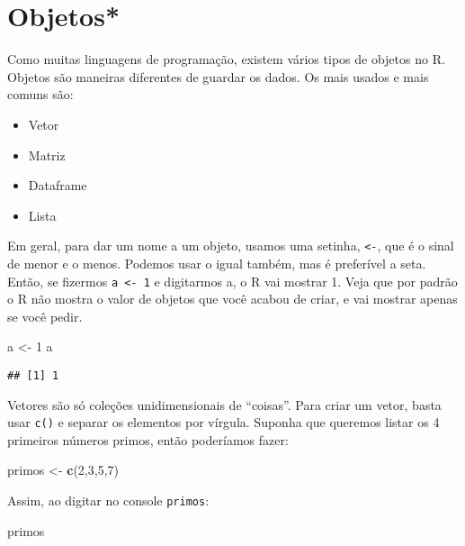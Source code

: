 \documentclass[
]{book}
\newenvironment{Shaded}{\begin{snugshade}}{\end{snugshade}}
\newcommand{\DecValTok}[1]{\textcolor[rgb]{0.00,0.00,0.81}{#1}}
\newcommand{\KeywordTok}[1]{\textcolor[rgb]{0.13,0.29,0.53}{\textbf{#1}}}
\newcommand{\NormalTok}[1]{#1}
\newcommand{\StringTok}[1]{\textcolor[rgb]{0.31,0.60,0.02}{#1}}
\providecommand{\tightlist}{%
  \setlength{\itemsep}{0pt}\setlength{\parskip}{0pt}}
\begin{document}
\hypertarget{objetos}{%
\section{Objetos*}\label{objetos}}

Como muitas linguagens de programação, existem vários tipos de objetos no R. Objetos são maneiras diferentes de guardar os dados. Os mais usados e mais comuns são:

\begin{itemize}
\tightlist
\item
  Vetor
\item
  Matriz
\item
  Dataframe
\item
  Lista
\end{itemize}

Em geral, para dar um nome a um objeto, usamos uma setinha, \texttt{\textless{}-}, que é o sinal de menor e o menos. Podemos usar o igual também, mas é preferível a seta. Então, se fizermos \texttt{a\ \textless{}-\ 1} e digitarmos a, o R vai mostrar 1. Veja que por padrão o R não mostra o valor de objetos que você acabou de criar, e vai mostrar apenas se você pedir.

\begin{Shaded}
\begin{Highlighting}[]
\NormalTok{a \textless{}{-}}\StringTok{ }\DecValTok{1}
\NormalTok{a}
\end{Highlighting}
\end{Shaded}

\begin{verbatim}
## [1] 1
\end{verbatim}

Vetores são só coleções unidimensionais de ``coisas''. Para criar um vetor, basta usar \texttt{c()} e separar os elementos por vírgula. Suponha que queremos listar os 4 primeiros números primos, então poderíamos fazer:

\begin{Shaded}
\begin{Highlighting}[]
\NormalTok{primos \textless{}{-}}\StringTok{ }\KeywordTok{c}\NormalTok{(}\DecValTok{2}\NormalTok{,}\DecValTok{3}\NormalTok{,}\DecValTok{5}\NormalTok{,}\DecValTok{7}\NormalTok{)}
\end{Highlighting}
\end{Shaded}

Assim, ao digitar no console \texttt{primos}:

\begin{Shaded}
\begin{Highlighting}[]
\NormalTok{primos}
\end{Highlighting}
\end{Shaded}
\end{document}
